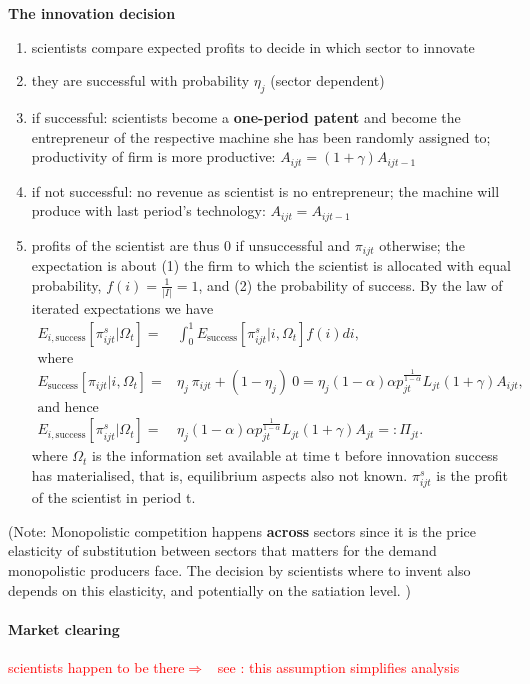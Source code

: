 \documentclass[12pt]{article}
\newcommand{\ar}{$\Rightarrow$ \ }
\newcommand{\tr}[1]{\textcolor{red}{#1}}
\begin{document}
\textbf{The innovation decision}
\begin{enumerate}
\item scientists compare expected profits to decide in which sector to innovate
\item they are successful with probability $\eta_j$ (sector dependent)
\item if successful: scientists become a \textbf{one-period patent} and become the entrepreneur of the respective machine she has been randomly assigned to; productivity of firm is more productive: $A_{ijt}=(1+\gamma)A_{ijt-1}$
\item if not successful: no revenue as scientist is no entrepreneur; the machine will produce with last period's  technology: $A_{ijt}=A_{ijt-1}$
\item profits of the scientist are thus 0 if unsuccessful and $\pi_{ijt}$ otherwise; the expectation is about (1) the firm to which the scientist is allocated with equal probability, $f(i)=\frac{1}{|I|}=1$, and (2) the probability of success. By the law of iterated expectations we have
\begin{align*}
E_{i,\text{success}}[\pi^s_{ijt}| \Omega_t]=& \int_{0}^{1}E_\text{success}[\pi^s_{ijt}|i, \Omega_t]f(i)di,\\ \text{where}&\\
E_\text{success}[\pi_{ijt}|i, \Omega_t]=& \eta_j\  \pi_{ijt}+(1-\eta_j)\ 0=\eta_j (1-\alpha)\alpha p_{jt}^\frac{1}{1-\alpha}L_{jt}(1+\gamma)A_{ijt},\\
\text{and hence}&\\
E_{i,\text{success}}[\pi^s_{ijt}| \Omega_t]=&\eta_j (1-\alpha)\alpha p_{jt}^\frac{1}{1-\alpha}L_{jt}(1+\gamma)A_{jt}=: \Pi_{jt}.
\end{align*}
where $\Omega_t$ is the information set available at time t before innovation success has materialised, that is, equilibrium aspects also not known. $\pi^s_{ijt}$ is the profit of the scientist in period t. 

\end{enumerate}
(Note: Monopolistic competition happens \textbf{across} sectors since it is the price elasticity of substitution between sectors that matters for the demand monopolistic producers face.
The decision by scientists where to invent also depends on this elasticity, and potentially on the satiation level. 
)

\paragraph{Market clearing}
\tr{scientists happen to be there\ar see  \cite{Acemoglu2002DirectedChange}: this assumption simplifies analysis }
\clearpage

\end{document}
